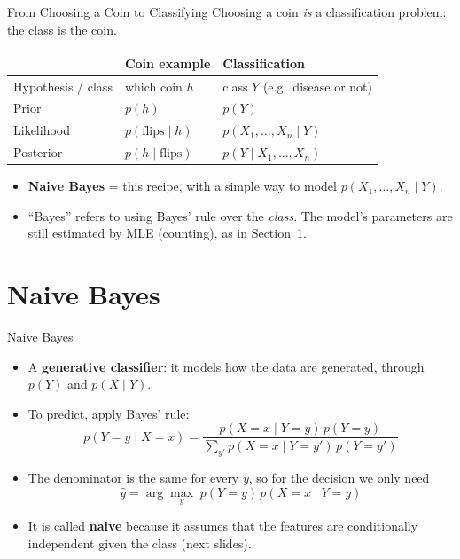 \documentclass[aspectratio=169]{beamer}
\begin{document}
\begin{frame}{From Choosing a Coin to Classifying}
Choosing a coin \emph{is} a classification problem: the class is the coin.

\vspace{0.3cm}
\centering
\begin{tabular}{lll}
\toprule
 & Coin example & Classification \\
\midrule
Hypothesis / class & which coin $h$ & class $Y$ (e.g.\ disease or not) \\
Prior & $p(h)$ & $p(Y)$ \\
Likelihood & $p(\text{flips}\mid h)$ & $p(X_1,\dots,X_n\mid Y)$ \\
Posterior & $p(h\mid\text{flips})$ & $p(Y\mid X_1,\dots,X_n)$ \\
\bottomrule
\end{tabular}

\vspace{0.4cm}
\raggedright
\begin{itemize}
  \item \textbf{Naive Bayes} = this recipe, with a simple way to model $p(X_1,\dots,X_n\mid Y)$.
  \item ``Bayes'' refers to using Bayes' rule over the \emph{class}. The model's parameters are still estimated by MLE (counting), as in Section~1.
\end{itemize}
\end{frame}

\section{Naive Bayes}

\begin{frame}{Naive Bayes}
\begin{itemize}
  \item A \textbf{generative classifier}: it models how the data are generated, through $p(Y)$ and $p(X\mid Y)$.
  \item To predict, apply Bayes' rule:
  \[
    p(Y=y\mid X=x)=\frac{p(X=x\mid Y=y)\,p(Y=y)}{\sum_{y'} p(X=x\mid Y=y')\,p(Y=y')}
  \]
  \item The denominator is the same for every $y$, so for the decision we only need
  \[
    \hat y = \arg\max_{y}\; p(Y=y)\,p(X=x\mid Y=y)
  \]
  \item It is called \textbf{naive} because it assumes that the features are conditionally independent given the class (next slides).
\end{itemize}
\end{frame}
\end{document}

